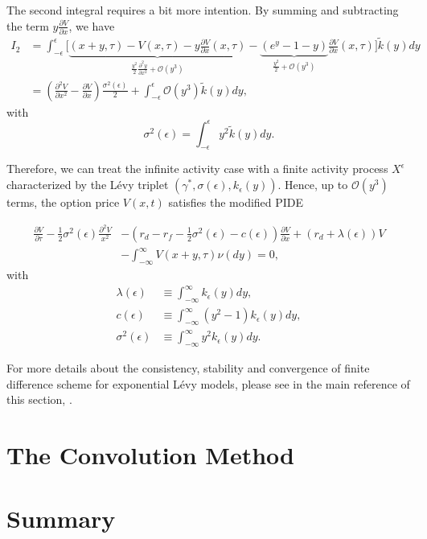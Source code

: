 The second integral requires a bit more intention. By summing and subtracting the term $y\frac{\partial V}{\partial x}$, we have
\begin{align*}
I_2 &= \int_{-\epsilon}^{\epsilon}\Bigg[\underbrace{(x+y,\tau)-V(x,\tau)-y\frac{\partial V}{\partial x}(x,\tau)}_{\frac{y^2}{2}\frac{\partial^2y}{\partial x^2}+\mathcal{O}(y^3)}-\underbrace{\left(e^y-1-y\right)}_{\frac{y^2}{2}+\mathcal{O}(y^3)}\frac{\partial V}{\partial x}(x,\tau)\Bigg]\tilde{k}(y)dy\\
&=\left(\frac{\partial^2 V}{\partial x^2}-\frac{\partial V}{\partial x}\right)\frac{\sigma^2(\epsilon)}{2}+\int_{-\epsilon}^\epsilon \mathcal{O}(y^3)\tilde{k}(y)dy,
\end{align*}
with $$\sigma^2(\epsilon) = \int_{-\epsilon}^\epsilon y^2\tilde{k}(y)dy.$$

Therefore, we can treat the infinite activity case with a finite activity process $X^\epsilon$ characterized by the L\'evy triplet $(\gamma^\ast,\sigma(\epsilon),k_\epsilon(y))$. Hence, up to $\mathcal{O}(y^3)$ terms, the option price $V(x,t)$ satisfies the modified PIDE

\begin{align*}\frac{\partial V}{\partial \tau}-\frac{1}{2}\sigma^2(\epsilon)\frac{\partial^2V}{x^2}&-\left(r_d-r_f-\frac{1}{2}\sigma^2(\epsilon) -c(\epsilon)\right)\frac{\partial V}{\partial x}+(r_d +\lambda(\epsilon))V \\
&-\int_{-\infty}^\infty V(x+y,\tau)\nu(dy) = 0,
\end{align*}
with
\begin{align*}
\lambda(\epsilon) &\equiv \int_{-\infty}^\infty k_\epsilon(y)dy,\\
c(\epsilon) &\equiv \int_{-\infty}^\infty \left(y^2-1\right)k_\epsilon(y)dy,\\
\sigma^2(\epsilon) &\equiv \int_{-\infty}^\infty y^2 k_\epsilon(y)dy.
\end{align*}

For more details about the consistency, stability and convergence of finite difference scheme for exponential L\'evy models, please see in the main reference of this section, \citep{CV05}.
\section{The Convolution Method}
\label{sec:methods:conv}

\section{Summary}
\label{sex:methods:summary}
